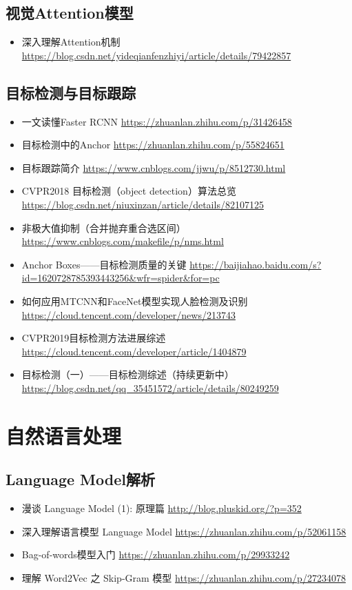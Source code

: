 \documentclass[11pt]{article}
\begin{document}
\subsection{视觉Attention模型}
\label{sec-4-2}
\begin{itemize}
\item\relax [计算机视觉]深入理解Attention机制 \url{https://blog.csdn.net/yideqianfenzhiyi/article/details/79422857}
\end{itemize}

\subsection{目标检测与目标跟踪}
\label{sec-4-3}
\begin{itemize}
\item 一文读懂Faster RCNN \url{https://zhuanlan.zhihu.com/p/31426458}
\item 目标检测中的Anchor \url{https://zhuanlan.zhihu.com/p/55824651}
\item 目标跟踪简介 \url{https://www.cnblogs.com/jjwu/p/8512730.html}
\item CVPR2018 目标检测（object detection）算法总览 \url{https://blog.csdn.net/niuxinzan/article/details/82107125}
\item 非极大值抑制（合并抛弃重合选区间） \url{https://www.cnblogs.com/makefile/p/nms.html}
\item Anchor Boxes——目标检测质量的关键 \url{https://baijiahao.baidu.com/s?id=1620728785393443256&wfr=spider&for=pc}
\item 如何应用MTCNN和FaceNet模型实现人脸检测及识别 \url{https://cloud.tencent.com/developer/news/213743}
\item CVPR2019目标检测方法进展综述 \url{https://cloud.tencent.com/developer/article/1404879}
\item 目标检测（一）——目标检测综述（持续更新中）\url{https://blog.csdn.net/qq_35451572/article/details/80249259}
\end{itemize}

\section{自然语言处理}
\label{sec-5}

\subsection{Language Model解析}
\label{sec-5-1}
\begin{itemize}
\item 漫谈 Language Model (1): 原理篇 \url{http://blog.pluskid.org/?p=352}
\item 深入理解语言模型 Language Model \url{https://zhuanlan.zhihu.com/p/52061158}
\item Bag-of-words模型入门 \url{https://zhuanlan.zhihu.com/p/29933242}
\item 理解 Word2Vec 之 Skip-Gram 模型 \url{https://zhuanlan.zhihu.com/p/27234078}
\end{itemize}
\end{document}
